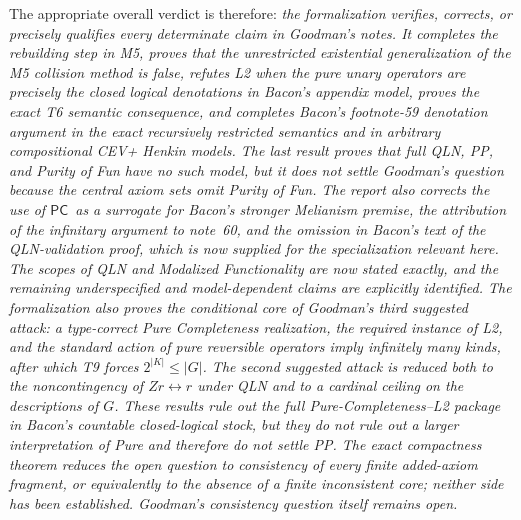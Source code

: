 \documentclass[12pt,leqno]{article}
\theoremstyle{plain}
\theoremstyle{definition}
\newcommand{\PC}{\ensuremath{\mathsf{PC}}}
\begin{document}
\bigskip

\noindent
The appropriate overall verdict is therefore:
\emph{the formalization verifies, corrects, or precisely qualifies every
determinate claim in Goodman's notes.  It completes the rebuilding step in
M5, proves that the unrestricted existential generalization of the M5
collision method is false, refutes L2 when the pure unary operators are
precisely the closed logical denotations in Bacon's appendix model, proves
the exact T6 semantic
consequence, and completes Bacon's footnote-59 denotation argument in the
exact recursively restricted semantics and in arbitrary compositional CEV+
Henkin models.  The
last result proves that full QLN, PP, and Purity of Fun have no such model,
but it does not settle Goodman's question because the central axiom sets omit
Purity of Fun.  The report also corrects the use of \PC\ as a surrogate for
Bacon's stronger Melianism premise, the attribution of the infinitary
argument to note~60, and the omission in Bacon's text of the QLN-validation
proof, which is now supplied for the specialization relevant here.  The
scopes of QLN and Modalized Functionality are now stated exactly,
and the remaining underspecified and model-dependent claims are explicitly
identified.  The formalization also proves the conditional core of Goodman's
third suggested attack: a type-correct Pure Completeness realization, the
required instance of L2, and the standard action of pure reversible operators imply infinitely
many kinds, after which T9 forces \(2^{|K|}\leq |G|\).  The second suggested
attack is reduced both to the noncontingency of \(Zr\leftrightarrow r\) under
QLN and to a cardinal ceiling on the descriptions of \(G\).  These results
rule out the full Pure-Completeness--L2 package in Bacon's countable
closed-logical stock, but they do not rule out a larger interpretation of
Pure and therefore do not settle PP.  The exact compactness theorem reduces
the open question to
consistency of every finite added-axiom fragment, or equivalently to the
absence of a finite inconsistent core; neither side has been established.
Goodman's consistency question itself remains open.}
\end{document}
